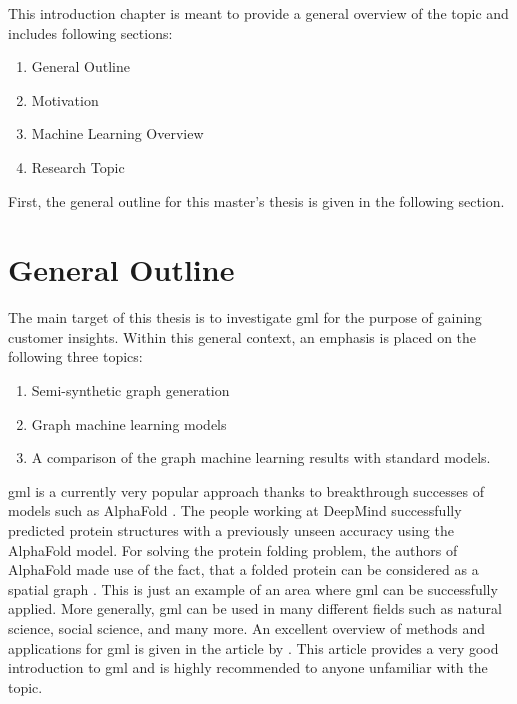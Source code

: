 	
	This introduction chapter is meant to provide a general overview of the
	topic and includes following sections:

	\begin{enumerate}
		\item General Outline
		\item Motivation
		\item Machine Learning Overview
		\item Research Topic
	\end{enumerate}

	\noindent First, the general outline for this master's thesis is given in
	the following section.
	
	\section{General Outline}

	The main target of this thesis is to investigate \ac{gml} for the purpose 
	of gaining customer insights. Within this general context, an emphasis is 
	placed on the following three topics:

	\begin{enumerate}
		\item Semi-synthetic graph generation
		\item Graph machine learning models
		\item A comparison of the graph machine learning results with standard
			models.
	\end{enumerate}

	\noindent \Acl{gml} is a currently very popular approach 
	thanks to breakthrough successes of models such as AlphaFold 
	\citep{senior2020improved}. The people working at DeepMind successfully
	predicted protein structures with a previously unseen accuracy using the 
	AlphaFold model. For solving the protein folding problem, the authors of
	AlphaFold made use of the fact, that a folded protein can be considered as
	a spatial graph \citep{AlphaFoldTeam2020}. This is just an example of an
	area where \acs{gml} can be successfully applied. More generally, \acs{gml} 
	can be used in many different fields such as natural science, social science, 
	and many more. An excellent overview of methods and applications for
	\acs{gml} is given in the article by \cite{zhou2020graph}. This article 
	provides a very good introduction to \acs{gml} and is highly recommended to 
	anyone unfamiliar with the topic. \\

